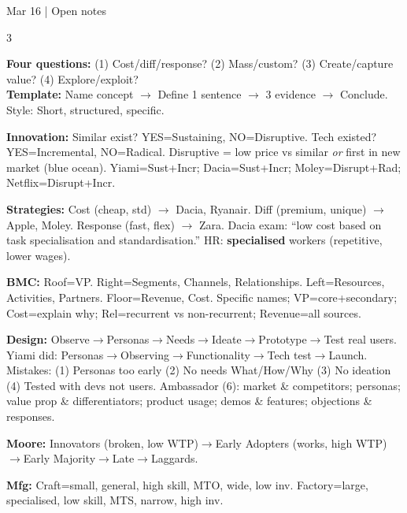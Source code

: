 \documentclass[8pt,a4paper]{article}
\begin{document}
\raggedright
\pagestyle{empty}
\enlargethispage{2mm}

\begin{center}\textbf{\color{eublue}{Product Management Midterm}}\quad Mar 16 | Open notes\end{center}
\vspace{-0.3em}
\begin{multicols}{3}
\scriptsize

\textbf{\color{eublue}Four questions:} (1) Cost/diff/response? (2) Mass/custom? (3) Create/capture value? (4) Explore/exploit?\\
\textbf{\color{eublue}Template:} Name concept $\to$ Define 1 sentence $\to$ 3 evidence $\to$ Conclude. Style: Short, structured, specific.

\textbf{\color{eublue}Innovation:} Similar exist? YES=Sustaining, NO=Disruptive. Tech existed? YES=Incremental, NO=Radical. Disruptive = low price vs similar \emph{or} first in new market (blue ocean). Yiami=Sust+Incr; Dacia=Sust+Incr; Moley=Disrupt+Rad; Netflix=Disrupt+Incr.

\textbf{\color{eublue}Strategies:} Cost (cheap, std) $\to$ Dacia, Ryanair. Diff (premium, unique) $\to$ Apple, Moley. Response (fast, flex) $\to$ Zara. Dacia exam: ``low cost based on task specialisation and standardisation.'' HR: \textbf{specialised} workers (repetitive, lower wages).

\textbf{\color{eublue}BMC:} Roof=VP. Right=Segments, Channels, Relationships. Left=Resources, Activities, Partners. Floor=Revenue, Cost. Specific names; VP=core+secondary; Cost=explain why; Rel=recurrent vs non-recurrent; Revenue=all sources.

\textbf{\color{eublue}Design:} Observe$\to$Personas$\to$Needs$\to$Ideate$\to$Prototype$\to$Test real users. Yiami did: Personas$\to$Observing$\to$Functionality$\to$Tech test$\to$Launch. Mistakes: (1) Personas too early (2) No needs What/How/Why (3) No ideation (4) Tested with devs not users. Ambassador (6): market \& competitors; personas; value prop \& differentiators; product usage; demos \& features; objections \& responses.

\textbf{\color{eublue}Moore:} Innovators (broken, low WTP)$\to$Early Adopters (works, high WTP)$\to$Early Majority$\to$Late$\to$Laggards.

\textbf{\color{eublue}Mfg:} Craft=small, general, high skill, MTO, wide, low inv. Factory=large, specialised, low skill, MTS, narrow, high inv.


\end{multicols}
\end{document}
